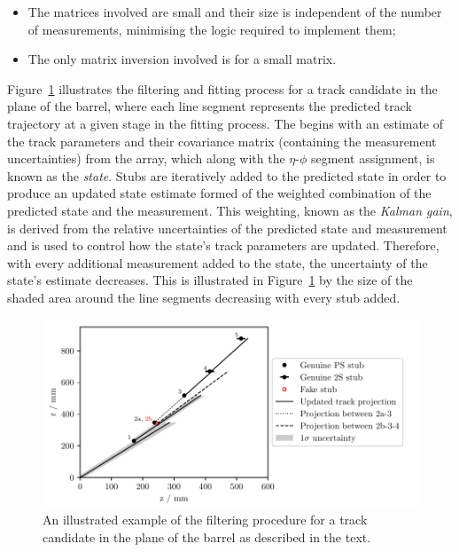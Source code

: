 \begin{itemize}
\item {The matrices involved are small and their size is independent of the number of measurements, minimising the logic required to implement them;}
\item {The only matrix inversion involved is for a small matrix.}
\end{itemize}


Figure~\ref{fig:KF} illustrates the \KF filtering and fitting process for a track candidate in the \rz plane of the barrel, where each line segment represents the predicted track trajectory at a given stage in the fitting process.
The \KF begins with an estimate of the track parameters and their covariance matrix (containing the measurement uncertainties) from the \HT array, which along with the $\eta$-$\phi$ segment assignment, is known as the \emph{state}.
Stubs are iteratively added to the predicted state in order to produce an updated state estimate formed of the weighted combination of the predicted state and the measurement.
This weighting, known as the \emph{Kalman gain}, is derived from the relative uncertainties of the predicted state and measurement and is used to control how the state's track parameters are updated.
Therefore, with every additional measurement added to the state, the uncertainty of the state's estimate decreases.
This is illustrated in Figure~\ref{fig:KF} by the size of the shaded area around the line segments decreasing with every stub added.

\begin{figure}[!h]
\centering
\includegraphics[width=\textwidth]{figs/tk-upgrade/kf_states.pdf}
\caption{An illustrated example of the \KF filtering procedure for a track candidate in the \rz plane of the barrel as described in the text.
}
\label{fig:KF}
\end{figure}

